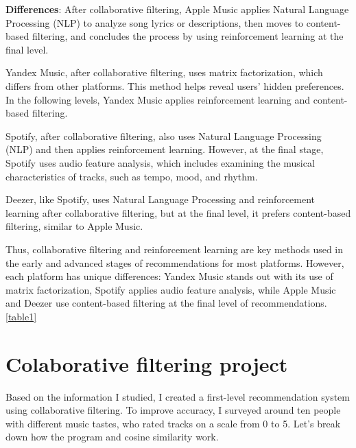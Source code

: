 \documentclass[12pt,a4paper]{article}
\begin{document}
\textbf{Differences}: After collaborative filtering, Apple Music applies Natural Language Processing (NLP) to analyze song lyrics or descriptions, then moves to content-based filtering, and concludes the process by using reinforcement learning at the final level.

Yandex Music, after collaborative filtering, uses matrix factorization, which differs from other platforms. This method helps reveal users' hidden preferences. In the following levels, Yandex Music applies reinforcement learning and content-based filtering.

Spotify, after collaborative filtering, also uses Natural Language Processing (NLP) and then applies reinforcement learning. However, at the final stage, Spotify uses audio feature analysis, which includes examining the musical characteristics of tracks, such as tempo, mood, and rhythm.

Deezer, like Spotify, uses Natural Language Processing and reinforcement learning after collaborative filtering, but at the final level, it prefers content-based filtering, similar to Apple Music.

Thus, collaborative filtering and reinforcement learning are key methods used in the early and advanced stages of recommendations for most platforms. However, each platform has unique differences: Yandex Music stands out with its use of matrix factorization, Spotify applies audio feature analysis, while Apple Music and Deezer use content-based filtering at the final level of recommendations. \autoref{table1}

\section{Colaborative filtering project}

Based on the information I studied, I created a first-level recommendation system using collaborative filtering. To improve accuracy, I surveyed around ten people with different music tastes, who rated tracks on a scale from 0 to 5. Let's break down how the program and cosine similarity work.
\end{document}
